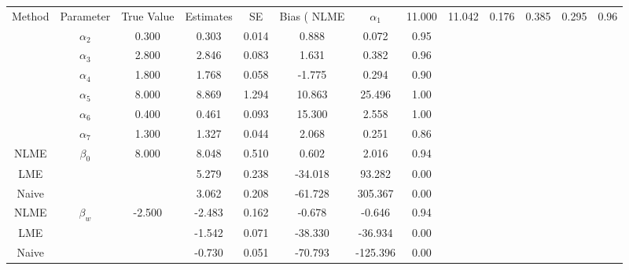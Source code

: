 \begin{table}[ht]
\centering
\begin{tabular}{cccccccc}
  \hline
Method & Parameter & True Value & Estimates & SE & Bias (%
  \hline
NLME & $\alpha_1$ & 11.000 & 11.042 & 0.176 & 0.385 & 0.295 & 0.96 \\ 
   & $\alpha_2$ & 0.300 & 0.303 & 0.014 & 0.888 & 0.072 & 0.95 \\ 
   & $\alpha_3$ & 2.800 & 2.846 & 0.083 & 1.631 & 0.382 & 0.96 \\ 
   & $\alpha_4$ & 1.800 & 1.768 & 0.058 & -1.775 & 0.294 & 0.90 \\ 
   & $\alpha_5$ & 8.000 & 8.869 & 1.294 & 10.863 & 25.496 & 1.00 \\ 
   & $\alpha_6$ & 0.400 & 0.461 & 0.093 & 15.300 & 2.558 & 1.00 \\ 
   & $\alpha_7$ & 1.300 & 1.327 & 0.044 & 2.068 & 0.251 & 0.86 \\ 
   \hline
NLME & $\beta_0$ & 8.000 & 8.048 & 0.510 & 0.602 & 2.016 & 0.94 \\ 
  LME &  &  & 5.279 & 0.238 & -34.018 & 93.282 & 0.00 \\ 
  Naive &  &  & 3.062 & 0.208 & -61.728 & 305.367 & 0.00 \\ 
  NLME & $\beta_w$ & -2.500 & -2.483 & 0.162 & -0.678 & -0.646 & 0.94 \\ 
  LME &  &  & -1.542 & 0.071 & -38.330 & -36.934 & 0.00 \\ 
  Naive &  &  & -0.730 & 0.051 & -70.793 & -125.396 & 0.00 \\ 
  \end{tabular}
\end{table}
